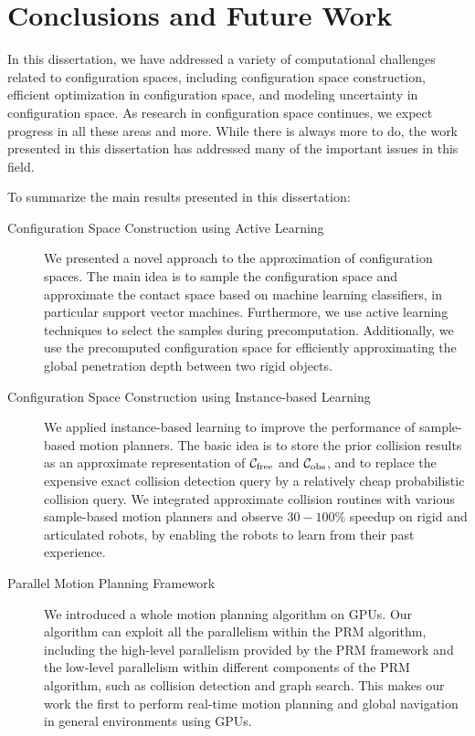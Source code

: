 \chapter{Conclusions and Future Work}
\label{chp:Conclusion}
In this dissertation, we have addressed a variety of computational challenges related to configuration spaces, including configuration space construction, efficient optimization in configuration space, and modeling uncertainty in configuration space. As research in configuration space continues, we expect progress in all these areas and more. While there is always more to do, the work presented in this dissertation has addressed many of the important issues in this field.

To summarize the main results presented in this dissertation:
\begin{description}
\item[Configuration Space Construction using Active Learning] We presented a novel approach to the approximation of configuration spaces. The main idea is to sample the configuration space and approximate the contact space based on machine learning classifiers, in particular support vector machines.
Furthermore, we use active learning techniques to select the samples during precomputation. Additionally, we use the precomputed configuration space for efficiently approximating the global penetration depth between two rigid objects.
\item[Configuration Space Construction using Instance-based Learning] We applied instance-based learning to improve the performance of sample-based motion planners. The basic idea is to store the prior collision results as an approximate representation of $\mathcal C_{\text{free}}$ and $\mathcal C_{\text{obs}}$, and to replace the expensive exact collision detection query by a relatively cheap probabilistic collision query. We integrated approximate collision routines with various sample-based motion planners and observe $30-100\%$ speedup on rigid and articulated robots, by enabling the robots to learn from their past experience.
\item[Parallel Motion Planning Framework] We introduced a whole motion planning algorithm on GPUs. Our algorithm can exploit all the parallelism within the PRM algorithm, including the high-level parallelism provided by the PRM framework and the low-level parallelism within different components of the PRM algorithm, such as collision detection and graph search. This makes our work the first to perform real-time motion planning and global navigation in general environments using GPUs.

\end{description}
